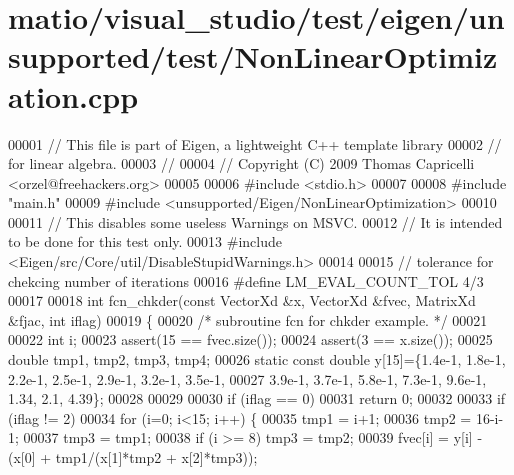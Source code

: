 \hypertarget{matio_2visual__studio_2test_2eigen_2unsupported_2test_2_non_linear_optimization_8cpp_source}{}\section{matio/visual\+\_\+studio/test/eigen/unsupported/test/\+Non\+Linear\+Optimization.cpp}
\label{matio_2visual__studio_2test_2eigen_2unsupported_2test_2_non_linear_optimization_8cpp_source}

\begin{DoxyCode}
00001 \textcolor{comment}{// This file is part of Eigen, a lightweight C++ template library}
00002 \textcolor{comment}{// for linear algebra.}
00003 \textcolor{comment}{//}
00004 \textcolor{comment}{// Copyright (C) 2009 Thomas Capricelli <orzel@freehackers.org>}
00005 
00006 \textcolor{preprocessor}{#include <stdio.h>}
00007 
00008 \textcolor{preprocessor}{#include "main.h"}
00009 \textcolor{preprocessor}{#include <unsupported/Eigen/NonLinearOptimization>}
00010 
00011 \textcolor{comment}{// This disables some useless Warnings on MSVC.}
00012 \textcolor{comment}{// It is intended to be done for this test only.}
00013 \textcolor{preprocessor}{#include <Eigen/src/Core/util/DisableStupidWarnings.h>}
00014 
00015 \textcolor{comment}{// tolerance for chekcing number of iterations}
00016 \textcolor{preprocessor}{#define LM\_EVAL\_COUNT\_TOL 4/3}
00017 
00018 \textcolor{keywordtype}{int} fcn\_chkder(\textcolor{keyword}{const} VectorXd &x, VectorXd &fvec, MatrixXd &fjac, \textcolor{keywordtype}{int} iflag)
00019 \{
00020     \textcolor{comment}{/*      subroutine fcn for chkder example. */}
00021 
00022     \textcolor{keywordtype}{int} i;
00023     assert(15 ==  fvec.size());
00024     assert(3 ==  x.size());
00025     \textcolor{keywordtype}{double} tmp1, tmp2, tmp3, tmp4;
00026     \textcolor{keyword}{static} \textcolor{keyword}{const} \textcolor{keywordtype}{double} y[15]=\{1.4e-1, 1.8e-1, 2.2e-1, 2.5e-1, 2.9e-1, 3.2e-1, 3.5e-1,
00027         3.9e-1, 3.7e-1, 5.8e-1, 7.3e-1, 9.6e-1, 1.34, 2.1, 4.39\};
00028 
00029 
00030     \textcolor{keywordflow}{if} (iflag == 0)
00031         \textcolor{keywordflow}{return} 0;
00032 
00033     \textcolor{keywordflow}{if} (iflag != 2)
00034         \textcolor{keywordflow}{for} (i=0; i<15; i++) \{
00035             tmp1 = i+1;
00036             tmp2 = 16-i-1;
00037             tmp3 = tmp1;
00038             \textcolor{keywordflow}{if} (i >= 8) tmp3 = tmp2;
00039             fvec[i] = y[i] - (x[0] + tmp1/(x[1]*tmp2 + x[2]*tmp3));

\end{DoxyCode}
